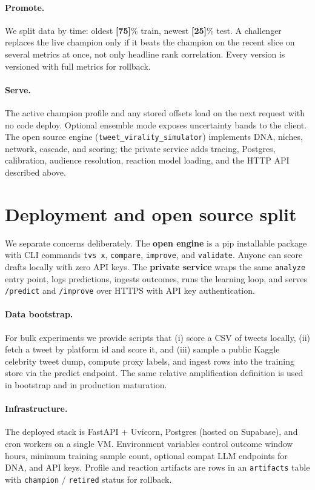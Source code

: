 \documentclass[11pt]{article}
\newcommand{\fill}[1]{\textbf{[#1]}}
\begin{document}
\paragraph{Promote.}
We split data by time: oldest \fill{75}\% train, newest \fill{25}\% test. A
challenger replaces the live champion only if it beats the champion on the
recent slice on several metrics at once, not only headline rank correlation. Every
version is versioned with full metrics for rollback.

\paragraph{Serve.}
The active champion profile and any stored offsets load on the next request with
no code deploy. Optional ensemble mode exposes uncertainty bands to the client.
The open source engine (\texttt{tweet\_virality\_simulator}) implements DNA,
niches, network, cascade, and scoring; the private service adds tracing,
Postgres, calibration, audience resolution, reaction model loading, and the
HTTP API described above.

\section{Deployment and open source split}

We separate concerns deliberately. The \textbf{open engine} is a pip installable
package with CLI commands \texttt{tvs x}, \texttt{compare}, \texttt{improve},
and \texttt{validate}. Anyone can score drafts locally with zero API keys. The
\textbf{private service} wraps the same \texttt{analyze} entry point, logs
predictions, ingests outcomes, runs the learning loop, and serves
\texttt{/predict} and \texttt{/improve} over HTTPS with API key authentication.

\paragraph{Data bootstrap.}
For bulk experiments we provide scripts that (i) score a CSV of tweets locally,
(ii) fetch a tweet by platform id and score it, and (iii) sample a public Kaggle
celebrity tweet dump, compute proxy labels, and ingest rows into the training
store via the predict endpoint. The same relative amplification definition is
used in bootstrap and in production maturation.

\paragraph{Infrastructure.}
The deployed stack is FastAPI + Uvicorn, Postgres (hosted on Supabase), and
cron workers on a single VM. Environment variables control outcome window hours,
minimum training sample count, optional compat LLM endpoints for DNA, and API
keys. Profile and reaction artifacts are rows in an \texttt{artifacts} table with
\texttt{champion} / \texttt{retired} status for rollback.
\end{document}
